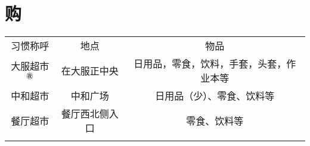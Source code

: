 \section[购]{购}
\label{market}
\begin{table}[H]
    \centering
    \begin{tabular}{|c|c|c|}
        \Xhline{1.2pt}
        习惯称呼       & 地点      & 物品                   \\
        \Xhline{1.2pt}
        大服超市$^{㊰}$ & 在大服正中央  & 日用品，零食，饮料，手套，头套，作业本等 \\
        \hline
        中和超市       & 中和广场    & 日用品（少）、零食、饮料等        \\
        \hline
        餐厅超市       & 餐厅西北侧入口 & 零食、饮料等               \\
        \Xhline{1.2pt}
    \end{tabular}
\end{table}

